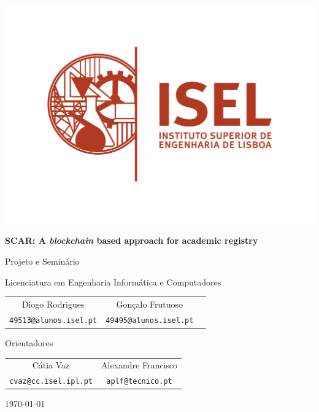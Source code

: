 \documentclass[10pt]{article}
\begin{document}
\begin{center}

    \includegraphics[scale=0.5]{assets/logo.png}

    \begin{LARGE}
        \textbf{SCAR\@: A \textit{blockchain} based approach for academic registry}
    \end{LARGE}

    \vspace{.75cm} Projeto e Seminário

    \vspace{.25cm} Licenciatura em Engenharia Informática e Computadores

    \vspace{.75cm}
    \begin{large}
        \begin{tabular}{ c c c }
            Diogo Rodrigues               & Gonçalo Frutuoso              \\
            \texttt{49513@alunos.isel.pt} & \texttt{49495@alunos.isel.pt} \\
        \end{tabular}

        \vspace{.75cm} Orientadores \vspace{0.25cm}

        \begin{tabular}{ c c }
            Cátia Vaz                    & Alexandre Francisco      \\
            \texttt{cvaz@cc.isel.ipl.pt} & \texttt{aplf@tecnico.pt}
        \end{tabular}
    \end{large}

    \vspace{.75cm} \today \vspace{.75cm}

\end{center}
\end{document}
